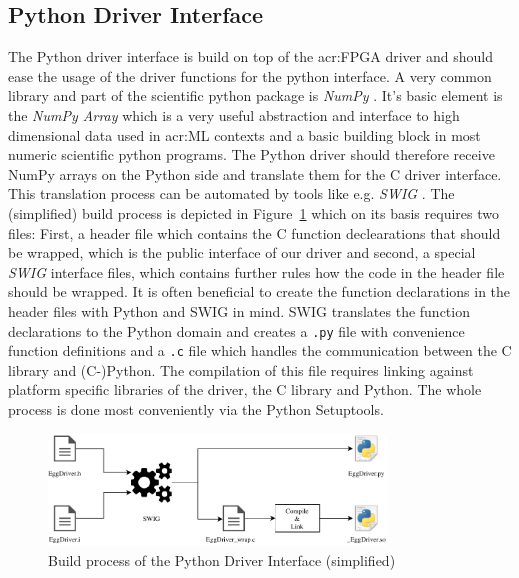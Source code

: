 \subsection{Python Driver Interface}
\label{sec:sw-python}

The Python driver interface is build on top of the \gls{acr:FPGA} driver and should ease the usage of the driver functions for the python interface. A very common library and part of the scientific python package is \emph{NumPy} \cite{Virtanen:2020aa}. It's basic element is the \emph{NumPy Array} \cite{Walt:2011aa} which is a very useful abstraction and interface to high dimensional data used in \gls{acr:ML} contexts and a basic building block in most numeric scientific python programs. The Python driver should therefore receive NumPy arrays on the Python side and translate them for the C driver interface. 
This translation process can be automated by tools like e.g. \emph{SWIG} \cite{Beazley:2003aa}.	The (simplified) build process is depicted in Figure~\ref{fig:sw-python-eggdriver-build} which on its basis requires two files: 
First, a header file which contains the C function declearations that should be wrapped, which is the public interface of our driver and second, a special \emph{SWIG} interface files, which contains further rules how the code in the header file should be wrapped. It is often beneficial to create the function declarations in the header files with Python and SWIG in mind. 
SWIG translates the function declarations to the Python domain and creates a \texttt{.py} file with convenience function definitions and a \texttt{.c} file which handles the communication between the C library and (C-)Python. The compilation of this file requires linking against platform specific libraries of the driver, the C library and Python. The whole process is done most conveniently via the Python Setuptools.

\begin{figure}[hbt]
  \centering
  \includegraphics[width=0.8\textwidth]{img/pydriver}
  \caption{Build process of the Python Driver Interface (simplified)}
  \label{fig:sw-python-eggdriver-build}
\end{figure}


